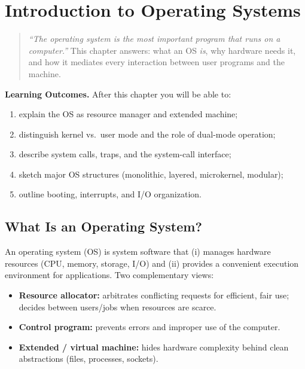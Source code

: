 \chapter{Introduction to Operating Systems}
\label{ch:intro}

\begin{quote}
\emph{``The operating system is the most important program that runs on a computer.''}
This chapter answers: what an OS \emph{is}, why hardware needs it, and how it
mediates every interaction between user programs and the machine.
\end{quote}

\noindent\textbf{Learning Outcomes.} After this chapter you will be able to:
\begin{enumerate}[label=(L\arabic*)]
  \item explain the OS as resource manager and extended machine;
  \item distinguish kernel vs.\ user mode and the role of dual-mode operation;
  \item describe system calls, traps, and the system-call interface;
  \item sketch major OS structures (monolithic, layered, microkernel, modular);
  \item outline booting, interrupts, and I/O organization.
\end{enumerate}

\section{What Is an Operating System?}
\label{sec:what-is-os}

An operating system (OS) is system software that (i) manages hardware resources
(CPU, memory, storage, I/O) and (ii) provides a convenient execution environment
for applications. Two complementary views:

\begin{itemize}
  \item \textbf{Resource allocator:} arbitrates conflicting requests for efficient,
        fair use; decides between users/jobs when resources are scarce.
  \item \textbf{Control program:} prevents errors and improper use of the computer.
  \item \textbf{Extended / virtual machine:} hides hardware complexity behind
        clean abstractions (files, processes, sockets).
\end{itemize}

